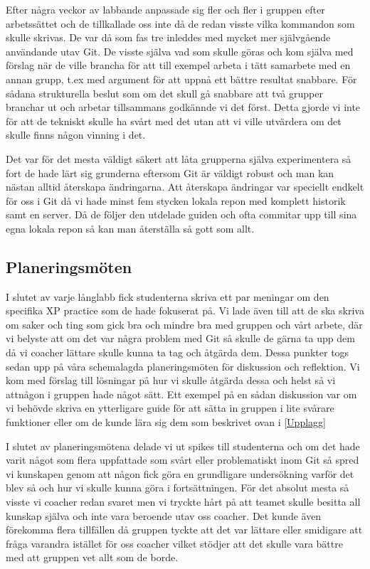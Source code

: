 Efter några veckor av labbande anpassade sig  fler och fler i gruppen efter arbetssättet och de tillkallade oss inte då de redan visste vilka kommandon som skulle skrivas. De var då som fas tre inleddes med mycket mer självgående användande utav Git. De visste själva vad som skulle göras och kom själva med förslag när de ville brancha för att till exempel arbeta i tätt samarbete med en annan grupp, t.ex med argument för att uppnå ett bättre resultat snabbare. För sådana strukturella beslut som om det skull gå snabbare att två grupper branchar ut och arbetar tillsammans godkännde vi det först. Detta gjorde vi inte för att de tekniskt skulle ha svårt med det utan att vi ville utvärdera om det skulle finns någon vinning i det.

Det var för det mesta väldigt säkert att låta grupperna själva experimentera så fort de hade lärt sig grunderna eftersom Git är väldigt robust och man kan nästan alltid återskapa ändringarna. Att återskapa ändringar var speciellt endkelt för oss i Git då vi hade minst fem stycken lokala repon med komplett historik samt en server. Då de följer den utdelade guiden och ofta commitar upp till sina egna lokala repon så kan man återställa så gott som allt.

\subsection{Planeringsmöten}

I slutet av varje långlabb fick studenterna skriva ett par meningar om den specifika XP practice som de hade fokuserat på. Vi lade även till att de ska skriva om saker och ting som gick bra och mindre bra med gruppen och vårt arbete, där vi belyste att om det var några problem med Git så skulle de gärna ta upp dem då vi coacher lättare skulle kunna ta tag och åtgärda dem. Dessa punkter togs sedan upp på våra schemalagda planeringsmöten för diskussion och reflektion. Vi kom med förslag till lösningar på hur vi skulle åtgärda dessa och helst så vi attnågon i gruppen hade något sätt. Ett exempel  på en sådan diskussion var om vi behövde skriva en ytterligare guide för att sätta in gruppen i lite svårare funktioner eller om de kunde lära sig dem som beskrivet ovan i \ref{Upplagg} 

I slutet av planeringsmötena delade vi ut spikes till studenterna och om det hade varit något som flera uppfattade som svårt eller problematiskt inom Git så spred vi kunskapen genom att någon fick göra en grundligare undersökning varför det blev så och hur vi skulle kunna göra i fortsättningen. För det absolut mesta så visste vi coacher redan svaret men vi tryckte hårt på att teamet skulle besitta all kunskap själva och inte vara beroende utav oss coacher. Det kunde även förekomma flera tillfällen då gruppen tyckte att det var lättare eller smidigare att fråga varandra istället för oss coacher vilket stödjer att det skulle vara bättre med att gruppen vet allt som de borde. 

